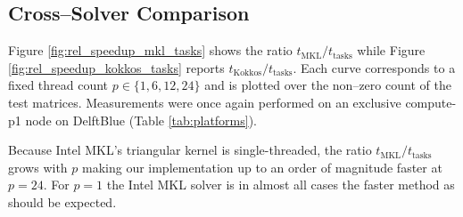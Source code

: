 \subsection{Cross–Solver Comparison}
\label{sec:results_rel_speedup}
Figure \ref{fig:rel_speedup_mkl_tasks} shows the ratio
$t_{\mathrm{MKL}}/t_{\text{tasks}}$ while
Figure \ref{fig:rel_speedup_kokkos_tasks} reports
$t_{\mathrm{Kokkos}}/t_{\text{tasks}}$.
Each curve corresponds to a fixed thread count
$p\in\{1,6,12,24\}$ and is plotted over the non–zero count
of the test matrices. Measurements were once again performed on an exclusive compute-p1 node on DelftBlue (Table \ref{tab:platforms}).

Because Intel MKL’s triangular kernel is single-threaded, the ratio
$t_{\mathrm{MKL}}/t_{\text{tasks}}$ grows with $p$ making
our implementation up to an order of magnitude faster at
$p=24$.
For $p=1$ the Intel MKL solver is in almost all cases the faster method as should be expected.

